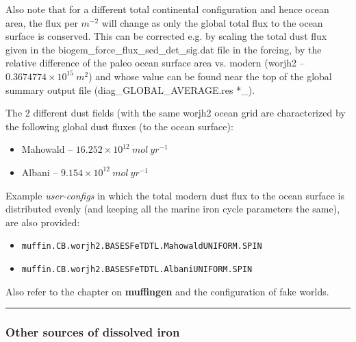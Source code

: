 \begin{enumerate}[noitemsep]
Also note that for a different total continental configuration and hence ocean area, the flux per \(m^{-2}\) will change as only the global total flux to the ocean surface is conserved. This can be corrected e.g. by scaling the total dust flux given in the \textsf{\footnotesize biogem\_force\_flux\_sed\_det\_sig.dat} file in the forcing, by the relative difference of the paleo ocean surface area vs. modern (\textsf{\footnotesize worjh2} -- \(0.3674774\times10^{15} \:m^{2}\)) and whose value can be found near the top of the global summary output file (\textsf{\footnotesize diag\_GLOBAL\_AVERAGE.res }*\_).

\vspace{1mm}
The 2 different dust fields (with the same \textsf{\footnotesize worjh2} ocean grid are characterized by the following global dust fluxes (to the ocean surface):
\vspace{1mm}
\begin{itemize}[noitemsep]
\item Mahowald -- \(16.252\times 10^{12}\:mol\:yr^{-1}\)
\item Albani -- \(9.154\times 10^{12}\:mol\:yr^{-1}\)
\end{itemize}
\vspace{1mm}

Example \textit{user-configs} in which the total modern dust flux to the ocean surface is distributed evenly (and keeping all the marine iron cycle parameters the same), are also provided:
\vspace{1mm}
\begin{itemize}[noitemsep]
\item \texttt{\small muffin.CB.worjh2.BASESFeTDTL.MahowaldUNIFORM.SPIN}
\item \texttt{\small muffin.CB.worjh2.BASESFeTDTL.AlbaniUNIFORM.SPIN}
\end{itemize}
\vspace{1mm}

Also refer to the chapter on \textbf{muffingen} and the configuration of fake worlds.

\end{enumerate}

%
\noindent\rule{4cm}{0.5pt}
\subsubsection{Other sources of dissolved iron}
\vspace{1mm}



